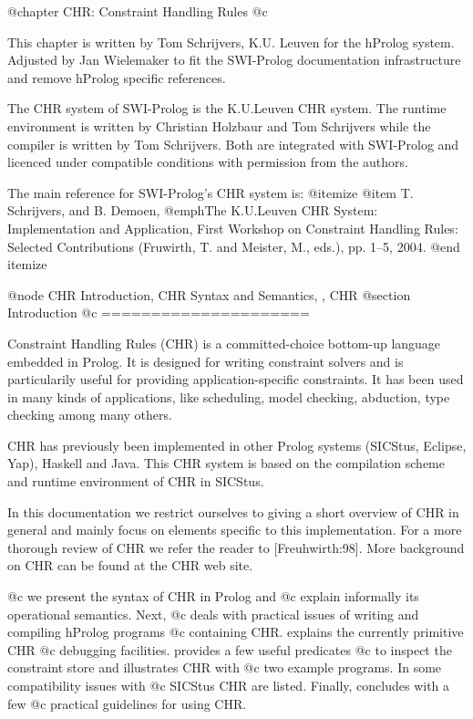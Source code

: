@chapter CHR: Constraint Handling Rules 
@c 		\label{sec:chr}

This chapter is written by Tom Schrijvers, K.U. Leuven for the hProlog
system. Adjusted by Jan Wielemaker to fit the SWI-Prolog documentation
infrastructure and remove hProlog specific references.

The CHR system of SWI-Prolog is the K.U.Leuven CHR system.  The runtime
environment is written by Christian Holzbaur and Tom Schrijvers while the
compiler is written by Tom Schrijvers. Both are integrated with SWI-Prolog
and licenced under compatible conditions with permission from the authors.

The main reference for SWI-Prolog's CHR system is:
@itemize
@item T. Schrijvers, and B. Demoen, @emph{The K.U.Leuven CHR System: Implementation
and Application}, First Workshop on Constraint Handling Rules: Selected
Contributions (Fruwirth, T. and Meister, M., eds.), pp. 1--5, 2004.
@end itemize

@node CHR Introduction, CHR Syntax and Semantics, , CHR
@section Introduction
@c =====================

Constraint Handling Rules (CHR) is a committed-choice bottom-up language
embedded in Prolog. It is designed for writing constraint solvers and is
particularily useful for providing application-specific constraints.
It has been used in many kinds of applications, like scheduling,
model checking, abduction, type checking among many others.

CHR has previously been implemented in other Prolog systems (SICStus,
Eclipse, Yap), Haskell and Java. This CHR system is based on the
compilation scheme and runtime environment of CHR in SICStus.

In this documentation we restrict ourselves to giving a short overview
of CHR in general and mainly focus on elements specific to this
implementation. For a more thorough review of CHR we refer the reader to
[Freuhwirth:98]. More background on CHR can be found at the CHR web site.

@c  we present the syntax of CHR in Prolog and
@c explain informally its operational semantics. Next, 
@c deals with practical issues of writing and compiling hProlog programs
@c containing CHR.  explains the currently primitive CHR
@c debugging facilities.  provides a few useful predicates
@c to inspect the constraint store and  illustrates CHR with
@c two example programs. In  some compatibility issues with
@c SICStus CHR are listed. Finally,  concludes with a few
@c practical guidelines for using CHR.


